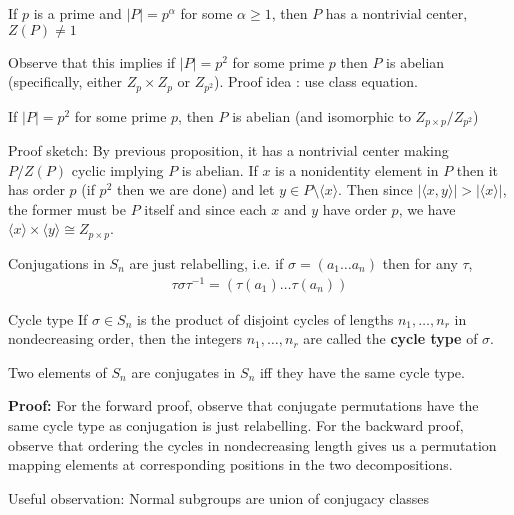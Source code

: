 \documentclass[titlepage, 12pt]{book}
\begin{document}
\begin{theorem}{}{}
    If $p$ is a prime and $|P| = p^\alpha$ for some $\alpha\geq 1$, then $P$ has
    a nontrivial center, $Z(P)\neq 1$
\end{theorem}
Observe that this implies if $|P| = p^2$ for some prime $p$ then $P$ is abelian
(specifically, either $Z_p\times Z_p$ or $Z_{p^2}$). Proof idea : use class
equation.

\begin{proposition}{}{}
    If $|P| = p^2$ for some prime $p$, then $P$ is abelian (and isomorphic to
    $Z_{p\times p}/Z_{p^2}$)
\end{proposition}
Proof sketch: By previous proposition, it has a nontrivial center making
$P/Z(P)$ cyclic implying $P$ is abelian. If $x$ is a nonidentity element in $P$
then it has order $p$ (if $p^2$ then we are done) and let $y\in P \setminus
\langle x\rangle$. Then since $|\langle x, y\rangle | > |\langle x\rangle |$,
the former must be $P$ itself and since each $x$ and $y$ have order $p$, we have
$\langle x\rangle \times \langle y\rangle\cong Z_{p\times p}$.

\begin{proposition}{}{}
    Conjugations in $S_n$ are just relabelling, i.e. if $\sigma = (a_1\dots
    a_n)$ then for any $\tau$,
    \begin{gather*}
        \tau\sigma\tau^{-1} = (\tau(a_1)\dots\tau(a_n))
    \end{gather*}
\end{proposition}

\begin{definition}{Cycle type}{}
    If $\sigma\in S_n$ is the product of disjoint cycles of lengths
    $n_1,\dots,n_r$ in nondecreasing order, then the integers $n_1,\dots,n_r$
    are called the \textbf{cycle type} of $\sigma$.
\end{definition}

\begin{proposition}{}{}
    Two elements of $S_n$ are conjugates in $S_n$ iff they have the same cycle
    type.
\end{proposition}
\textbf{Proof:} For the forward proof, observe that conjugate permutations have
the same cycle type as conjugation is just relabelling. For the backward proof,
observe that ordering the cycles in nondecreasing length gives us a permutation
mapping elements at corresponding positions in the two decompositions.

Useful observation: Normal subgroups are union of conjugacy classes
\end{document}
